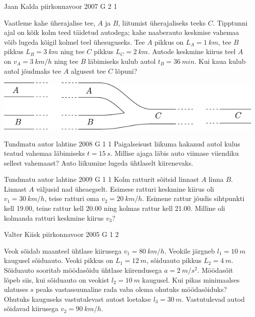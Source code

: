 \documentclass[11pt]{article}
\begin{document}
{%
{Jaan Kalda} %
{piirkonnavoor} %
{2007} %
{G 2} %
{1} %
{
\ifStatement
Vaatleme kahe üherajalise tee, $A$ ja $B$, liitumist üherajaliseks teeks $C$. Tipptunni ajal on kõik kolm teed täidetud autodega; kahe naaberauto keskmise vahemaa võib lugeda kõigil kolmel teel ühesuguseks. Tee $A$ pikkus on $L_A = \SI{1}{km}$, tee $B$ pikkus $L_B = \SI{3}{km}$ ning tee $C$ pikkus $L_C = \SI{2}{km}$. Autode keskmine kiirus teel $A$ on $v_A = \SI{3}{km/h}$ ning tee $B$ läbimiseks kulub autol $t_B = \SI{36}{min}$. Kui kaua kulub autol jõudmaks tee $A$ algusest tee $C$ lõpuni?
\begin{center}
	\includegraphics[width=0.9\linewidth]{2007-v2g-02-yl}
\end{center}
\fi
}

{Tundmatu autor} %
{lahtine} %
{2008} %
{G 1} %
{1} %
{
\ifStatement
Paigalseisust liikuma hakanud autol kulus teatud vahemaa läbimiseks $t = \SI{15}{s}$. Millise ajaga läbis auto viimase viiendiku sellest vahemaast? Auto liikumine lugeda ühtlaselt kiirenevaks.
\fi
}

{Tundmatu autor} %
{lahtine} %
{2009} %
{G 1} %
{1} %
{
\ifStatement
Kolm ratturit sõitsid linnast $A$ linna $B$. Linnast $A$ väljusid nad üheaegselt. Esimese ratturi keskmine kiirus oli $v_1 = \SI{30}{km/h}$, teise ratturi oma $v_2 = \SI{20}{km/h}$. Esimene rattur jõudis sihtpunkti kell 19.00, teine rattur kell 20.00 ning kolmas rattur kell 21.00. Milline oli kolmanda ratturi keskmine kiirus $v_3$?
\fi
}

{Valter Kiisk} %
{piirkonnavoor} %
{2005} %
{G 1} %
{2} %
{
\ifStatement
Veok sõidab maanteel ühtlase kiirusega $v_1 = \SI{80}{km/h}$. Veokile järgneb $l_1 = \SI{10}{m}$ kaugusel sõiduauto. Veoki pikkus on $L_1 = \SI{12}{m}$, sõiduauto pikkus $L_2 = \SI{4}{m}$. Sõiduauto sooritab möödasõidu ühtlase kiirendusega $a = \SI{2}{m/s^2}$. Möödasõit lõpeb siis, kui sõiduauto on veokist $l_2 = \SI{10}{m}$ kaugusel. Kui pikas minimaalses ulatuses $s$ peaks vastassuunaline rada vaba olema ohutuks möödasõiduks? Ohutuks kauguseks vastutulevast autost loetakse $l_3 = \SI{30}{m}$. Vastutulevad autod sõidavad kiirusega $v_2 = \SI{90}{km/h}$.

}}
\end{document}
